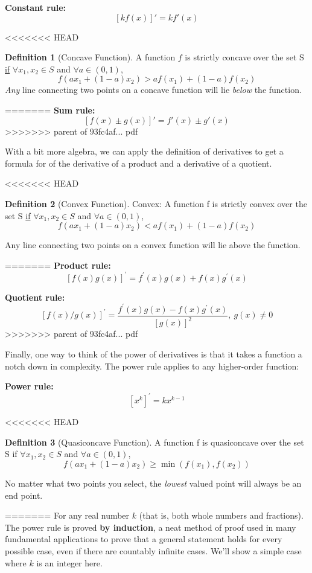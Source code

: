 \documentclass[]{book}
\theoremstyle{definition}
\newtheorem{definition}{Definition}[chapter]
\theoremstyle{definition}
\theoremstyle{definition}
\theoremstyle{remark}
\begin{document}
\textbf{Constant rule:} \[\left[k f(x)\right]' = k f'(x)\]

<<<<<<< HEAD
\begin{definition}[Concave Function]
\protect\hypertarget{def:unnamed-chunk-47}{}{\label{def:unnamed-chunk-47} {} }A function \(f\) is strictly concave over the set S \underline{if} \(\forall x_1,x_2 \in S\) and \(\forall a \in (0,1)\), \[f(ax_1 + (1-a)x_2) > af(x_1) + (1-a)f(x_2)\]
\textit{Any} line connecting two points on a concave function will lie \textit{below} the function.
\end{definition}
=======
\textbf{Sum rule:} \[\left[f(x)\pm g(x)\right]' = f'(x)\pm g'(x)\]
>>>>>>> parent of 93fc4af... pdf

With a bit more algebra, we can apply the definition of derivatives to get a formula for of the derivative of a product and a derivative of a quotient.

<<<<<<< HEAD
\begin{definition}[Convex Function]
\protect\hypertarget{def:unnamed-chunk-49}{}{\label{def:unnamed-chunk-49} {} }Convex: A function f is strictly convex over the set S \underline{if} \(\forall x_1,x_2 \in S\) and \(\forall a \in (0,1)\), \[f(ax_1 + (1-a)x_2) < af(x_1) + (1-a)f(x_2)\]

Any line connecting two points on a convex function will lie above the function.
\end{definition}
=======
\textbf{Product rule:} \[\left[f(x)g(x)\right]^\prime = f^\prime(x)g(x)+f(x)g^\prime(x)\]

\textbf{Quotient rule:} \[\left[f(x)/g(x)\right]^\prime = \frac{f^\prime(x)g(x) - f(x)g^\prime(x)}{[g(x)]^2}, ~g(x)\neq 0\]
>>>>>>> parent of 93fc4af... pdf

Finally, one way to think of the power of derivatives is that it takes a function a notch down in complexity. The power rule applies to any higher-order function:

\textbf{Power rule:} \[\left[x^k\right]^\prime = k x^{k-1}\]

<<<<<<< HEAD
\begin{definition}[Quasiconcave Function]
\protect\hypertarget{def:unnamed-chunk-50}{}{\label{def:unnamed-chunk-50} {} }A function f is quasiconcave over the set S if \(\forall x_1,x_2 \in S\) and \(\forall a \in (0,1)\), \[f(ax_1 + (1-a)x_2) \ge \min(f(x_1),f(x_2))\]

No matter what two points you select, the \textit{lowest} valued point will always be an end point.
\end{definition}
=======
For any real number \(k\) (that is, both whole numbers and fractions). The power rule is proved \textbf{by induction}, a neat method of proof used in many fundamental applications to prove that a general statement holds for every possible case, even if there are countably infinite cases. We'll show a simple case where \(k\) is an integer here.
\end{document}
